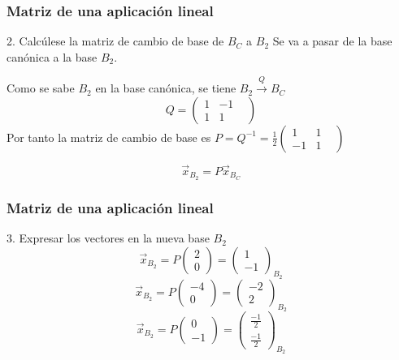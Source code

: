 \documentclass{beamer}
\begin{document}
  \begin{frame}
  \frametitle{Matriz de una aplicaci\'on lineal}
\begin{block}{2. Calc\'ulese la matriz de cambio de base de $B_C$ a $B_2$}
Se va a pasar de la base can\'onica a la base $B_2$. 

Como se sabe $B_2$ en la base can\'onica, se tiene $B_2\xrightarrow{Q}B_C$
\[Q = \left(\begin{array}{ccc}1 & -1 &   \\1 & 1 &  \end{array}\right)\]
Por tanto la matriz de cambio de base es $P = Q^{-1} = \frac{1}{2}\left(\begin{array}{ccc}1 & 1 &   \\-1 & 1 &  \end{array}\right)$

\[\vec x_{B_2} = P \vec x_{B_C}\]
\end{block}
  \end{frame}    
  
  
    \begin{frame}
  \frametitle{Matriz de una aplicaci\'on lineal}
\begin{block}{3. Expresar los vectores en la nueva base $B_2$}
\[\vec x_{B_2} = P \left(\begin{array}{r}2 \\0\end{array}\right) = \left(\begin{array}{r}1 \\-1\end{array}\right)_{B_2}\]
\[\vec x_{B_2} = P \left(\begin{array}{r}-4 \\0\end{array}\right) = \left(\begin{array}{r}-2 \\2\end{array}\right)_{B_2}\]
\[\vec x_{B_2} = P \left(\begin{array}{r}0 \\-1\end{array}\right) = \left(\begin{array}{r}\frac{-1}{2} \\ \frac{-1}{2}\end{array}\right)_{B_2}\]
\end{block}
  \end{frame}    
  
\end{document}

